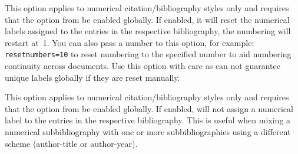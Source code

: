 \documentclass{ltxdockit}[2011/03/25]
\newcommand*{\biblatex}{\sty{biblatex}\xspace}
\begin{document}
\begin{optionlist*}

This option applies to numerical citation\slash bibliography styles only and requires that the  option from  be enabled globally. If enabled, it will reset the numerical labels assigned to the entries in the respective bibliography, \ie the numbering will restart at~1. You can also pass a number to this option, for example: \texttt{resetnumbers=10} to reset numbering to the specified number to aid numbering continuity across documents. Use this option with care as \biblatex can not guarantee unique labels globally if they are reset manually.


This option applies to numerical citation\slash bibliography styles only and requires that the  option from  be enabled globally. If enabled, \biblatex will not assign a numerical label to the entries in the respective bibliography. This is useful when mixing a numerical subbibliography with one or more subbibliographies using a different scheme (\eg author-title or author-year).

\end{optionlist*}
\end{document}
